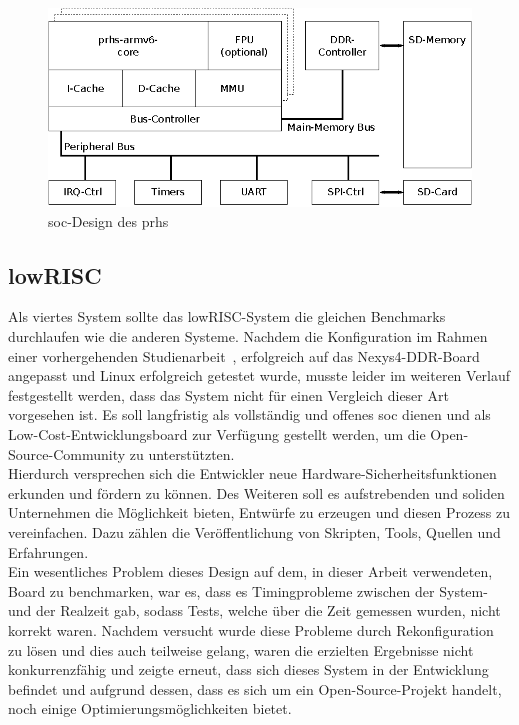 \begin{figure}[H]
\centering
\includegraphics[width=1\textwidth]{Hauptteil/prhs.eps}
\caption{\ac{soc}-Design des \ac{prhs}}
\label{fig:prhs}
\end{figure}


\subsection{lowRISC}\label{kap:lowrisc}
Als viertes System sollte das lowRISC-System die gleichen Benchmarks durchlaufen wie die anderen Systeme.
Nachdem die Konfiguration im Rahmen einer vorhergehenden Studienarbeit~\cite{studienarbeit},
erfolgreich auf das Nexys4-DDR-Board angepasst
und Linux erfolgreich getestet wurde, musste leider im weiteren Verlauf festgestellt werden, dass das System
 nicht für einen Vergleich dieser Art vorgesehen ist. Es soll langfristig als vollständig
und offenes \ac{soc} dienen und als Low-Cost-Entwicklungsboard zur Verfügung gestellt werden, um die
 Open-Source-Community zu unterstützten.\\
Hierdurch versprechen sich die Entwickler neue Hardware-Sicherheitsfunktionen erkunden und fördern zu können.
 Des Weiteren soll es aufstrebenden und soliden Unternehmen die Möglichkeit bieten,
Entwürfe zu erzeugen und diesen Prozess zu vereinfachen. Dazu zählen die Veröffentlichung von Skripten,
Tools, Quellen und Erfahrungen.\\
Ein wesentliches Problem dieses Design auf dem, in dieser Arbeit verwendeten, Board zu benchmarken, war es, dass es
 Timingprobleme zwischen der System- und der Realzeit gab, sodass Tests,
welche über die Zeit gemessen wurden, nicht korrekt waren. Nachdem versucht wurde diese Probleme durch
Rekonfiguration zu lösen und dies auch teilweise gelang, waren die erzielten Ergebnisse
nicht konkurrenzfähig und zeigte erneut, dass sich dieses System in der Entwicklung befindet und aufgrund dessen,
 dass es sich um ein Open-Source-Projekt handelt, noch einige Optimierungsmöglichkeiten bietet.\\



